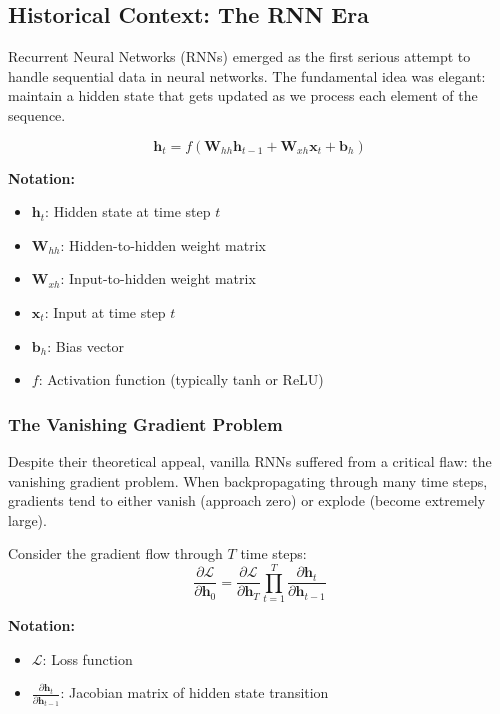 \documentclass[11pt]{article}
\begin{document}
\subsection{Historical Context: The RNN Era}

Recurrent Neural Networks (RNNs) emerged as the first serious attempt to handle sequential data in neural networks. The fundamental idea was elegant: maintain a hidden state that gets updated as we process each element of the sequence.

\begin{equation}
\mathbf{h}_t = f(\mathbf{W}_{hh}\mathbf{h}_{t-1} + \mathbf{W}_{xh}\mathbf{x}_t + \mathbf{b}_h)
\end{equation}
\begin{notationbox}
\textbf{Notation:}
\begin{itemize}
    \item $\mathbf{h}_t$: Hidden state at time step $t$
    \item $\mathbf{W}_{hh}$: Hidden-to-hidden weight matrix
    \item $\mathbf{W}_{xh}$: Input-to-hidden weight matrix
    \item $\mathbf{x}_t$: Input at time step $t$
    \item $\mathbf{b}_h$: Bias vector
    \item $f$: Activation function (typically tanh or ReLU)
\end{itemize}
\end{notationbox}

\subsubsection{The Vanishing Gradient Problem}

Despite their theoretical appeal, vanilla RNNs suffered from a critical flaw: the vanishing gradient problem. When backpropagating through many time steps, gradients tend to either vanish (approach zero) or explode (become extremely large).

Consider the gradient flow through $T$ time steps:
\begin{equation}
\frac{\partial \mathcal{L}}{\partial \mathbf{h}_0} = \frac{\partial \mathcal{L}}{\partial \mathbf{h}_T} \prod_{t=1}^{T} \frac{\partial \mathbf{h}_t}{\partial \mathbf{h}_{t-1}}
\end{equation}
\begin{notationbox}
\textbf{Notation:}
\begin{itemize}
    \item $\mathcal{L}$: Loss function
    \item $\frac{\partial \mathbf{h}_t}{\partial \mathbf{h}_{t-1}}$: Jacobian matrix of hidden state transition
\end{itemize}
\end{notationbox}
\end{document}
